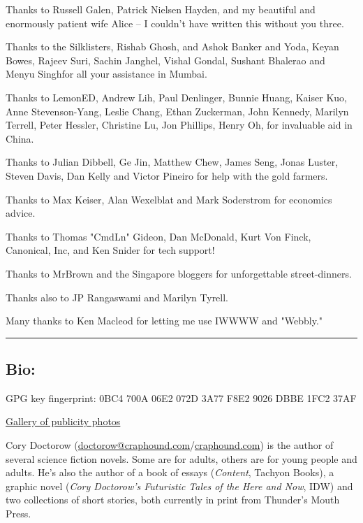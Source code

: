 Thanks to Russell Galen, Patrick Nielsen Hayden, and my beautiful
and enormously patient wife Alice -- I couldn't have written this
without you three.

Thanks to the Silklisters, Rishab Ghosh, and Ashok Banker and Yoda,
Keyan Bowes, Rajeev Suri, Sachin Janghel, Vishal Gondal, Sushant
Bhalerao and Menyu Singhfor all your assistance in Mumbai.

Thanks to LemonED, Andrew Lih, Paul Denlinger, Bunnie Huang, Kaiser
Kuo, Anne Stevenson-Yang, Leslie Chang, Ethan Zuckerman, John
Kennedy, Marilyn Terrell, Peter Hessler, Christine Lu, Jon
Phillips, Henry Oh, for invaluable aid in China.

Thanks to Julian Dibbell, Ge Jin, Matthew Chew, James Seng, Jonas
Luster, Steven Davis, Dan Kelly and Victor Pineiro for help with
the gold farmers.

Thanks to Max Keiser, Alan Wexelblat and Mark Soderstrom for
economics advice.

Thanks to Thomas "CmdLn" Gideon, Dan McDonald, Kurt Von Finck,
Canonical, Inc, and Ken Snider for tech support!

Thanks to MrBrown and the Singapore bloggers for unforgettable
street-dinners.

Thanks also to JP Rangaswami and Marilyn Tyrell.

Many thanks to Ken Macleod for letting me use IWWWW and "Webbly."

\begin{center}\rule{3in}{0.4pt}\end{center}

\subsection{Bio:}

GPG key fingerprint: 0BC4 700A 06E2 072D 3A77 F8E2 9026 DBBE 1FC2
37AF

\href{http://www.flickr.com/photos/doctorow/sets/72157622138315932/}{Gallery of publicity photos}

Cory Doctorow
(\href{mailto:doctorow@craphound.com}{doctorow@craphound.com}/\href{http://craphound.com/}{craphound.com})
is the author of several science fiction novels. Some are for
adults, others are for young people and adults. He's also the
author of a book of essays (\emph{Content}, Tachyon Books), a
graphic novel
(\emph{Cory Doctorow's Futuristic Tales of the Here and Now}, IDW)
and two collections of short stories, both currently in print from
Thunder's Mouth Press.

